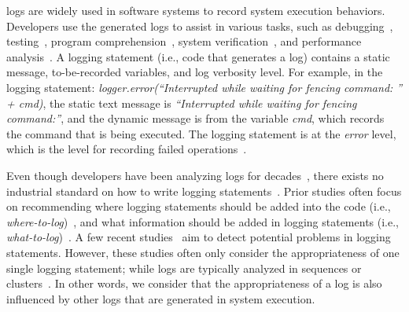 

 logs are widely used in software systems to record system execution behaviors. Developers use the generated logs to assist in various tasks, such as debugging~\cite{Yuan:2011:ISD:1950365.1950369, Yuan:2010:SED:1736020.1736038, Fu:2014:DLE:2591062.2591175,gino_DS, ARC_log_bug_report, cyfICSE2019,hpj_log_analysis_TDSC18,hpj_ISSRE16}, testing~\cite{Chen:2017:ALT:3103112.3103144, jacktool, jackase2018,JF_ASE19}, program comprehension~\cite{Hassan:2008:ICS:1368088.1379445, Shang:2014:ULL:2705615.2706065,joy_mobile_log}, system verification~\cite{Busany:2016:BLA:2884781.2884805, DBLP:journals/jacic/BarringerGHS10}, and performance analysis~\cite{Chen:2016:CHD:2950290.2950303, kundi_icpe_2018, zs_performance_test,kundi_log_compression}. A logging statement (i.e., code that generates a log) contains a static message, to-be-recorded variables, and log verbosity level. For example, in the logging statement: {\em logger.error(``Interrupted while waiting for fencing command: '' + cmd)}, the static text message is {\em ``Interrupted while waiting for fencing command:''}, and the dynamic message is from the variable {\em cmd}, which records the command that is being executed. The logging statement is at the {\em error} level, which is the level for recording failed operations~\cite{log4j}.


Even though developers have been analyzing logs for decades~\cite{Kabinna:2016:LLM:2901739.2901769}, there exists no industrial standard on how to write logging statements~\cite{Fu:2014:DLE:2591062.2591175, 7202961}. Prior studies often focus on recommending where logging statements should be added into the code (i.e., {\em where-to-log})~\cite{Zhu:2015:LLH:2818754.2818807, wheretologASE, wheretologSRC, Zhao:2017:LFA:3132747.3132778}, and what information should be added in logging statements (i.e., {\em what-to-log})~\cite{Shang:2014:ULL:2705615.2706065, Yuan:2011:ISD:1950365.1950369, aseLog2018,loglevel_ICSE21}. A few recent studies~\cite{log_pattern_ICSE2017, mehran_emse_2018} aim to detect potential problems in logging statements. However, these studies often only consider the appropriateness of one single logging statement; while logs are typically analyzed in sequences or clusters~\cite{Yuan:2011:ISD:1950365.1950369, Chen:2016:CHD:2950290.2950303}. In other words, we consider that the appropriateness of a log is also influenced by other logs that are generated in system execution.

